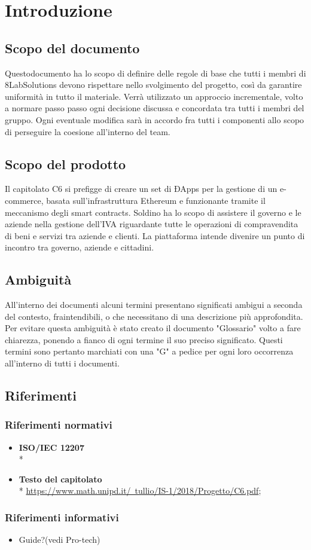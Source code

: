 \section{Introduzione}
\subsection{Scopo del documento}
Questo\glosp documento ha lo scopo di definire delle regole di base che tutti i membri di 8LabSolutions devono rispettare nello svolgimento del progetto, così da garantire uniformità in tutto il materiale. Verrà utilizzato un approccio incrementale, volto a normare passo passo ogni decisione discussa e concordata tra tutti i membri del gruppo. Ogni eventuale modifica sarà in accordo fra tutti i componenti allo scopo di perseguire la coesione all'interno del team.
\subsection{Scopo del prodotto}
Il capitolato C6 si prefigge di creare un set di ÐApps per la gestione di un e-commerce, basata sull'infrastruttura Ethereum e funzionante tramite il meccanismo degli smart contracts. Soldino ha lo scopo di assistere il governo e le aziende nella gestione dell'IVA riguardante tutte le operazioni di compravendita di beni e servizi tra aziende e clienti. La piattaforma intende divenire un punto di incontro tra governo, aziende e cittadini.
\subsection{Ambiguità}
All’interno dei documenti alcuni termini presentano significati ambigui  a  seconda del contesto, fraintendibili, o che necessitano di una descrizione più approfondita. Per evitare questa ambiguità è stato creato il documento "Glossario" volto a fare chiarezza, ponendo a fianco di ogni termine il suo preciso significato. Questi termini sono pertanto marchiati con una "G" a pedice per ogni loro occorrenza all'interno di tutti i documenti.
\subsection{Riferimenti}
\subsubsection{Riferimenti normativi}
\begin{itemize}
\item \textbf{ISO/IEC 12207} \\* %
\item \textbf{Testo del capitolato} \\*  \href{https://www.math.unipd.it/~tullio/IS-1/2018/Progetto/C6.pdf}{https://www.math.unipd.it/~tullio/IS-1/2018/Progetto/C6.pdf};
\end{itemize}
\subsubsection{Riferimenti informativi}
\begin{itemize}
\item Guide?(vedi Pro-tech)
\end{itemize}